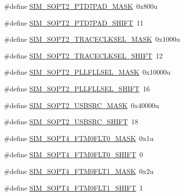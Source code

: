 \begin{DoxyCompactItemize}
\item 
\#define \hyperlink{group___s_i_m___register___masks_gaf295c85205620f0ece4cf7a888fc298f}{S\+I\+M\+\_\+\+S\+O\+P\+T2\+\_\+\+P\+T\+D7\+P\+A\+D\+\_\+\+M\+A\+SK}~0x800u
\item 
\#define \hyperlink{group___s_i_m___register___masks_ga82543a91a19387f58f922371b4b5cc95}{S\+I\+M\+\_\+\+S\+O\+P\+T2\+\_\+\+P\+T\+D7\+P\+A\+D\+\_\+\+S\+H\+I\+FT}~11
\item 
\#define \hyperlink{group___s_i_m___register___masks_ga332894211abcda547cbf5d5093bd3f72}{S\+I\+M\+\_\+\+S\+O\+P\+T2\+\_\+\+T\+R\+A\+C\+E\+C\+L\+K\+S\+E\+L\+\_\+\+M\+A\+SK}~0x1000u
\item 
\#define \hyperlink{group___s_i_m___register___masks_ga6ce7d361b38ac28e6976c71569fe672b}{S\+I\+M\+\_\+\+S\+O\+P\+T2\+\_\+\+T\+R\+A\+C\+E\+C\+L\+K\+S\+E\+L\+\_\+\+S\+H\+I\+FT}~12
\item 
\#define \hyperlink{group___s_i_m___register___masks_gaa14141a225f9778babacbf3b90d0bae2}{S\+I\+M\+\_\+\+S\+O\+P\+T2\+\_\+\+P\+L\+L\+F\+L\+L\+S\+E\+L\+\_\+\+M\+A\+SK}~0x10000u
\item 
\#define \hyperlink{group___s_i_m___register___masks_gae98b4d574b65472bdb294092d4ce5b4a}{S\+I\+M\+\_\+\+S\+O\+P\+T2\+\_\+\+P\+L\+L\+F\+L\+L\+S\+E\+L\+\_\+\+S\+H\+I\+FT}~16
\item 
\#define \hyperlink{group___s_i_m___register___masks_ga1caf7ffe2555eb59ed410110b6aba463}{S\+I\+M\+\_\+\+S\+O\+P\+T2\+\_\+\+U\+S\+B\+S\+R\+C\+\_\+\+M\+A\+SK}~0x40000u
\item 
\#define \hyperlink{group___s_i_m___register___masks_ga2a455b7e86f26185c92961e139d13a89}{S\+I\+M\+\_\+\+S\+O\+P\+T2\+\_\+\+U\+S\+B\+S\+R\+C\+\_\+\+S\+H\+I\+FT}~18
\item 
\#define \hyperlink{group___s_i_m___register___masks_gaa868cd9e56dc4f0280f6d1866da1ac57}{S\+I\+M\+\_\+\+S\+O\+P\+T4\+\_\+\+F\+T\+M0\+F\+L\+T0\+\_\+\+M\+A\+SK}~0x1u
\item 
\#define \hyperlink{group___s_i_m___register___masks_gafc9e6a78afb92b0ff8189d6bc30c39ce}{S\+I\+M\+\_\+\+S\+O\+P\+T4\+\_\+\+F\+T\+M0\+F\+L\+T0\+\_\+\+S\+H\+I\+FT}~0
\item 
\#define \hyperlink{group___s_i_m___register___masks_gaa42586e5889050292d5e70bf2d1aea2d}{S\+I\+M\+\_\+\+S\+O\+P\+T4\+\_\+\+F\+T\+M0\+F\+L\+T1\+\_\+\+M\+A\+SK}~0x2u
\item 
\#define \hyperlink{group___s_i_m___register___masks_gaf503fb0314431593f41ebe5fa4b83851}{S\+I\+M\+\_\+\+S\+O\+P\+T4\+\_\+\+F\+T\+M0\+F\+L\+T1\+\_\+\+S\+H\+I\+FT}~1
\item 

\end{DoxyCompactItemize}

